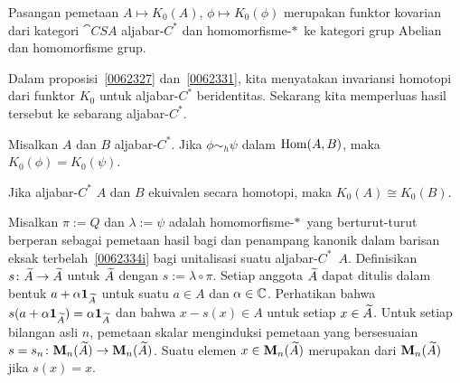 \begin{prop}\label{0062511} Pasangan pemetaan $A \mapsto K_0(A)$, $\phi \mapsto K_0(\phi)$ merupakan
funktor kovarian dari kategori $\cat{CSA}$ aljabar-$C^*$ dan homomorfisme-$*\,$ ke
kategori grup Abelian dan homomorfisme grup.
\end{prop}

Dalam proposisi~\ref{0062327} dan~\ref{0062331}, kita menyatakan invariansi homotopi dari
funktor $K_0$ untuk aljabar-$C^*$ beridentitas. Sekarang kita memperluas hasil tersebut ke sebarang
aljabar-$C^*$.

\begin{prop}\label{0062521} Misalkan $A$ dan $B$ aljabar-$C^*$. Jika $\phi \sim_h \psi$
dalam $\operatorname{Hom}(A,B)$, maka $K_0(\phi) = K_0(\psi)$.
\end{prop}


\begin{prop}\label{0062524} Jika aljabar-$C^*$ $A$ dan $B$ ekuivalen secara homotopi,
maka $K_0(A) \cong K_0(B)$.
\end{prop}


\begin{defn} Misalkan $\pi:=Q$ dan $\lambda:=\psi$ adalah homomorfisme-$*\,$ yang berturut-turut berperan sebagai pemetaan hasil bagi dan penampang kanonik dalam barisan eksak
terbelah~\eqref{0062334i} bagi unitalisasi suatu aljabar-$C^*$~$A$. Definisikan %
 $s\colon \widetilde{A} \rightarrow \widetilde{A}$ untuk $\widetilde{A}$ dengan $s :=  \lambda \circ \pi$. Setiap
anggota $\widetilde{A}$ dapat ditulis dalam bentuk $a + \alpha \mathbf{1}_{\widetilde{A}}$ untuk suatu $a \in A$ dan
$\alpha \in \mathbb{C}$. Perhatikan bahwa $s(a + \alpha \mathbf{1}_{\widetilde{A}}) = \alpha \mathbf{1}_{\widetilde{A}}$ dan bahwa $x
- s(x) \in A$ untuk setiap $x \in \widetilde{A}$. Untuk setiap bilangan asli $n$, pemetaan skalar menginduksi
pemetaan yang bersesuaian $s = s_n\colon \mathbf{M}_{n}({\widetilde{A}}) \rightarrow \mathbf{M}_{n}({\widetilde{A}})$. Suatu elemen $x \in \mathbf{M}_{n}({\widetilde{A}})$ merupakan
 dari $\mathbf{M}_{n}({\widetilde{A}})$ jika $s(x) = x$.
\end{defn}


